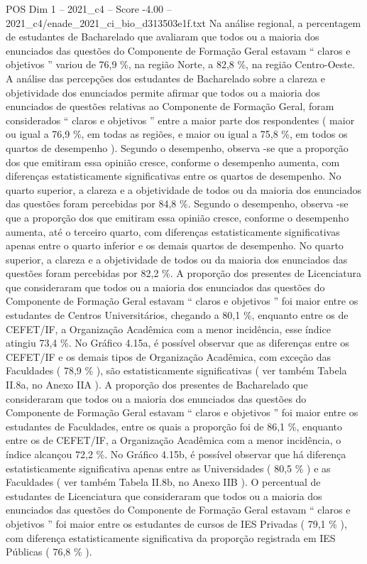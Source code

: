 \begin{textsample}{POS Dim 1 – 2021\_c4 – Score -4.00 – 2021\_c4/enade\_2021\_ci\_bio\_d313503e1f.txt}
Na análise regional, a percentagem de estudantes de Bacharelado que avaliaram que todos ou a maioria dos enunciados das questões do Componente de Formação Geral estavam “ claros e objetivos ” variou de 76,9 \%, na região Norte, a 82,8 \%, na região Centro-Oeste.
A análise das percepções dos estudantes de Bacharelado sobre a clareza e objetividade dos enunciados permite afirmar que todos ou a maioria dos enunciados de questões relativas ao Componente de Formação Geral, foram considerados “ claros e objetivos ” entre a maior parte dos respondentes ( maior ou igual a 76,9 \%, em todas as regiões, e maior ou igual a 75,8 \%, em todos os quartos de desempenho ).
Segundo o desempenho, observa -se que a proporção dos que emitiram essa opinião cresce, conforme o desempenho aumenta, com diferenças estatisticamente significativas entre os quartos de desempenho.
No quarto superior, a clareza e a objetividade de todos ou da maioria dos enunciados das questões foram percebidas por 84,8 \%.
Segundo o desempenho, observa -se que a proporção dos que emitiram essa opinião cresce, conforme o desempenho aumenta, até o terceiro quarto, com diferenças estatisticamente significativas apenas entre o quarto inferior e os demais quartos de desempenho.
No quarto superior, a clareza e a objetividade de todos ou da maioria dos enunciados das questões foram percebidas por 82,2 \%.
A proporção dos presentes de Licenciatura que consideraram que todos ou a maioria dos enunciados das questões do Componente de Formação Geral estavam “ claros e objetivos ” foi maior entre os estudantes de Centros Universitários, chegando a 80,1 \%, enquanto entre os de CEFET/IF, a Organização Acadêmica com a menor incidência, esse índice atingiu 73,4 \%.
No Gráfico 4.15a, é possível observar que as diferenças entre os CEFET/IF e os demais tipos de Organização Acadêmica, com exceção das Faculdades ( 78,9 \% ), são estatisticamente significativas ( ver também Tabela II.8a, no Anexo IIA ).
A proporção dos presentes de Bacharelado que consideraram que todos ou a maioria dos enunciados das questões do Componente de Formação Geral estavam “ claros e objetivos ” foi maior entre os estudantes de Faculdades, entre os quais a proporção foi de 86,1 \%, enquanto entre os de CEFET/IF, a Organização Acadêmica com a menor incidência, o índice alcançou 72,2 \%.
No Gráfico 4.15b, é possível observar que há diferença estatisticamente significativa apenas entre as Universidades ( 80,5 \% ) e as Faculdades ( ver também Tabela II.8b, no Anexo IIB ).
O percentual de estudantes de Licenciatura que consideraram que todos ou a maioria dos enunciados das questões do Componente de Formação Geral estavam “ claros e objetivos ” foi maior entre os estudantes de cursos de IES Privadas ( 79,1 \% ), com diferença estatisticamente significativa da proporção registrada em IES Públicas ( 76,8 \% ).

\end{textsample}
